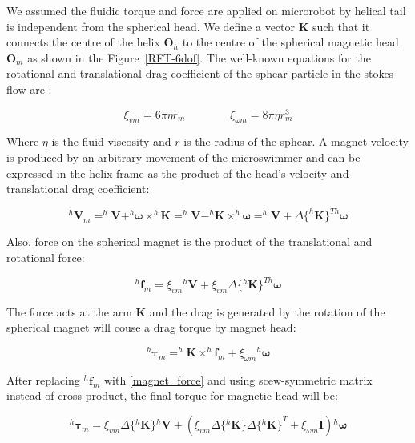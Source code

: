 \documentclass[12pt,a4paper,titlepage]{report}
\begin{document}
We assumed the fluidic torque and force are applied on microrobot by helical tail is independent from the
spherical head. We define a vector $\bm K$ such that it connects the centre of the helix $\bm O_h$ to the 
centre of the spherical magnetic head $\bm O_m$ as shown in the Figure~\ref{RFT-6dof}. The well-known
equations for the rotational and translational drag coefficient of the sphear particle in the stokes flow 
 are \citep{white1991viscous}:


\begin{equation}
\xi_{vm} = 6 \pi \eta r_m \qquad \qquad \xi_{\omega m} = 8 \pi \eta r^3_m
\label{shearical_drag_coefficients}
\end{equation}


Where $\eta$ is the fluid viscosity and $r$ is the radius of the sphear. A magnet velocity is produced by an 
arbitrary movement of the microswimmer and can be expressed in the helix frame as the product of the
head\rq{}s velocity and translational drag coefficient:


\begin{equation}
^{h}\bm V_{m} = ^{h}\bm{V} + ^{h}\bm{\omega} \times ^{h}\bm{ K }= ^{h}\bm {V} - ^{h}\bm{K} \times ^{h}\bm{\omega}
= ^{h}\bm{V} + \Delta \{^{h}\bm{ K} \}^{Th} \bm{\omega}
\label{magnet_velocity}
\end{equation}

Also, force on the spherical magnet is the product of the translational and rotational force:

 
\begin{equation}
^{h}\bm{f}_{m} = \xi_{vm} {^{h}{\bm{V}}} + \xi_{vm} \Delta\{ {^{h}\bm{K}}\}^{Th} \bm{\omega}
\label{magnet_force}
\end{equation}

The force acts at the arm $\bm{K}$ and the drag is generated by the rotation of the spherical magnet will 
couse a drag torque by magnet head:

 \begin{equation}
^{h}\bm{\tau}_{m} = ^{h}\bm{K} \times  ^{h}\bm{f}_{m} + \xi_{\omega m} {^{h}\bm{\omega}}
\label{magnet_head_torque}
\end{equation}

After replacing $^{h}\bm{f}_{m}$ with \ref{magnet_force} and using scew-symmetric matrix instead of
cross-product, the final torque for magnetic head will be:

 

\begin{equation}
^{h}\bm{\tau}_{m} = \xi_{vm}\Delta\{ {^{h}\bm{K}}\} {^{h}{\bm{V}}} + (\xi_{vm} \Delta\{ {^{h}\bm{K}}\}   {\Delta\{ {^{h}\bm{K}}\}}^{T} + \xi_{\omega m}  \bm{I} ){^{h}\bm{\omega}}
\label{magnet_torque_final}
\end{equation}
\end{document}
